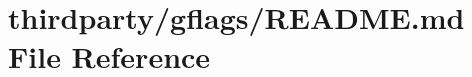 \hypertarget{thirdparty_2gflags_2README_8md}{}\section{thirdparty/gflags/\+R\+E\+A\+D\+ME.md File Reference}
\label{thirdparty_2gflags_2README_8md}
